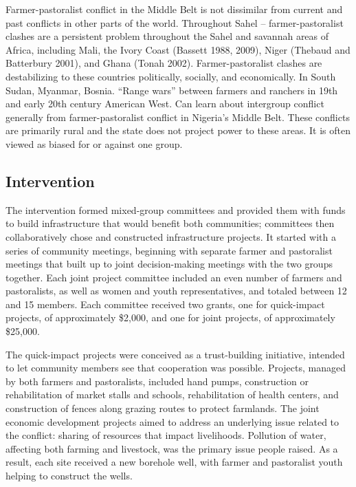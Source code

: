 \documentclass[11pt]{article}
\begin{document}
Farmer-pastoralist conflict in the Middle Belt is not dissimilar from
current and past conflicts in other parts of the world. Throughout Sahel
-- farmer-pastoralist clashes are a persistent problem throughout the
Sahel and savannah areas of Africa, including Mali, the Ivory Coast
(Bassett 1988, 2009), Niger (Thebaud and Batterbury 2001), and Ghana
(Tonah 2002). Farmer-pastoralist clashes are destabilizing to these
countries politically, socially, and economically. In South Sudan,
Myanmar, Bosnia. ``Range wars'' between farmers and ranchers in 19th and
early 20th century American West. Can learn about intergroup conflict
generally from farmer-pastoralist conflict in Nigeria's Middle Belt.
These conflicts are primarily rural and the state does not project power
to these areas. It is often viewed as biased for or against one group.

\subsection{Intervention}\label{intervention}

The intervention formed mixed-group committees and provided them with
funds to build infrastructure that would benefit both communities;
committees then collaboratively chose and constructed infrastructure
projects. It started with a series of community meetings, beginning with
separate farmer and pastoralist meetings that built up to joint
decision-making meetings with the two groups together. Each joint
project committee included an even number of farmers and pastoralists,
as well as women and youth representatives, and totaled between 12 and
15 members. Each committee received two grants, one for quick-impact
projects, of approximately \$2,000, and one for joint projects, of
approximately \$25,000.

The quick-impact projects were conceived as a trust-building initiative,
intended to let community members see that cooperation was possible.
Projects, managed by both farmers and pastoralists, included hand pumps,
construction or rehabilitation of market stalls and schools,
rehabilitation of health centers, and construction of fences along
grazing routes to protect farmlands. The joint economic development
projects aimed to address an underlying issue related to the conflict:
sharing of resources that impact livelihoods. Pollution of water,
affecting both farming and livestock, was the primary issue people
raised. As a result, each site received a new borehole well, with farmer
and pastoralist youth helping to construct the wells.
\end{document}

